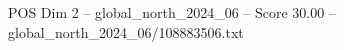 \begin{textsample}{POS Dim 2 – global\_north\_2024\_06 – Score 30.00 – global\_north\_2024\_06/108883506.txt}
\end{textsample}
